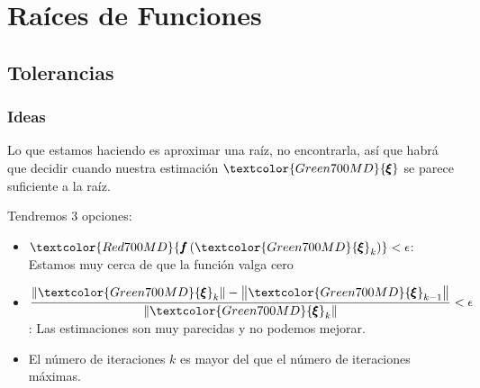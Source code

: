 \documentclass[12pt, fleqn]{report}                             %
\theoremstyle{break}                                            %
\newcommand{\Wrap}[1]           {\left( #1 \right)}             %
\newcommand{\Abs}[1]    {\left\lVert #1 \right\lVert}           %
\newcommand{\Color}[2]{\textcolor{#1}{#2}}                      %
\newcommand \ColorFun          {Red700MD}                       %
\newcommand \ColorRoot         {Green700MD}                     %
\newcommand \Fun[1]      {\Color{\ColorFun}{\pmb{f}\Wrap{#1}}}          %
\newcommand \Root        {\Color{\ColorRoot}{\pmb{\xi} }}               %
\begin{document}
\tableofcontents{}
\label{sec:Index}

\clearpage



\part{Raíces de Funciones}
\clearpage

    \chapter{Tolerancias}

        \section{Ideas}

            Lo que estamos haciendo es aproximar una raíz, no encontrarla, así que habrá que decidir
            cuando nuestra estimación $\Root$ se parece suficiente a la raíz.

            Tendremos 3 opciones:
            \begin{itemize}
                \item $\Fun{\Root_k} < \epsilon$: Estamos muy cerca de que la función valga cero
                \item $\dfrac{ \Abs{\Root_k} - \Abs{\Root_{k-1}} }{\Abs{\Root_k}} < \epsilon$: Las
                    estimaciones son muy parecidas y no podemos mejorar.
                \item El número de iteraciones $k$ es mayor del que el número de iteraciones máximas.
            \end{itemize}
\end{document}
